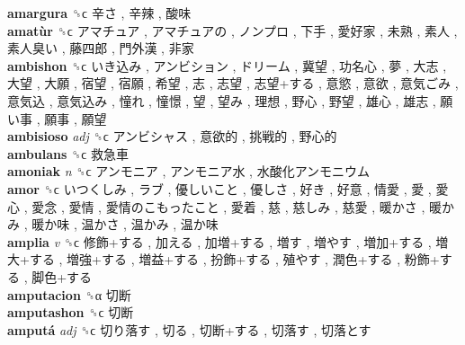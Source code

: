 \textbf{amargura} ␝ϲ   辛さ ,  辛辣 ,  酸味   \\
\textbf{amatùr} ␝ϲ   アマチュア ,  アマチュアの ,  ノンプロ ,  下手 ,  愛好家 ,  未熟 ,  素人 ,  素人臭い ,  藤四郎 ,  門外漢 ,  非家   \\
\textbf{ambishon} ␝ϲ   いき込み ,  アンビション ,  ドリーム ,  冀望 ,  功名心 ,  夢 ,  大志 ,  大望 ,  大願 ,  宿望 ,  宿願 ,  希望 ,  志 ,  志望 ,  志望+する ,  意慾 ,  意欲 ,  意気ごみ ,  意気込 ,  意気込み ,  憧れ ,  憧憬 ,  望 ,  望み ,  理想 ,  野心 ,  野望 ,  雄心 ,  雄志 ,  願い事 ,  願事 ,  願望   \\
\textbf{ambisioso} \emph{adj}  ␝ϲ   アンビシャス ,  意欲的 ,  挑戦的 ,  野心的   \\
\textbf{ambulans} ␝ϲ   救急車   \\
\textbf{amoniak} \emph{n}  ␝ϲ   アンモニア ,  アンモニア水 ,  水酸化アンモニウム   \\
\textbf{amor} ␝ϲ   いつくしみ ,  ラブ ,  優しいこと ,  優しさ ,  好き ,  好意 ,  情愛 ,  愛 ,  愛心 ,  愛念 ,  愛情 ,  愛情のこもったこと ,  愛着 ,  慈 ,  慈しみ ,  慈愛 ,  暖かさ ,  暖かみ ,  暖か味 ,  温かさ ,  温かみ ,  温か味   \\
\textbf{amplia} \emph{v}  ␝ϲ   修飾+する ,  加える ,  加増+する ,  増す ,  増やす ,  増加+する ,  増大+する ,  増強+する ,  増益+する ,  扮飾+する ,  殖やす ,  潤色+する ,  粉飾+する ,  脚色+する   \\
\textbf{amputacion} ␝α   切断   \\
\textbf{amputashon} ␝ϲ   切断   \\
\textbf{amputá} \emph{adj}  ␝ϲ   切り落す ,  切る ,  切断+する ,  切落す ,  切落とす   \\
